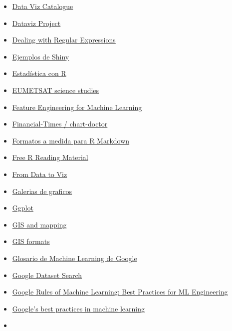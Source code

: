 \documentclass[
  letterpaper,
  DIV=11,
  numbers=noendperiod]{scrartcl}
\begin{document}
\begin{itemize}
{  Scientist Roadmap}
\item
  \href{https://graphica.app/catalogue}{Data Viz Catalogue}
\item
  \href{https://datavizproject.com/}{Dataviz Project}
\item
  \href{http://uc-r.github.io/regex}{Dealing with Regular Expressions}
\item
  \href{http://zevross.com/blog/2016/04/19/r-powered-web-applications-with-shiny-a-tutorial-and-cheat-sheet-with-40-example-apps/}{Ejemplos
  de Shiny}
\item
  \href{https://www.cienciadedatos.net/estadistica-con-r.html}{Estadística
  con R}
\item
  \href{https://www.eumetsat.int/science-studies}{EUMETSAT science
  studies}
\item
  \href{https://trainindata.medium.com/feature-engineering-for-machine-learning-a-comprehensive-overview-a7ad04c896f8}{Feature
  Engineering for Machine Learning}
\item
  \href{https://github.com/Financial-Times/chart-doctor/tree/main/visual-vocabulary}{Financial-Times
  / chart-doctor}
\item
  \href{http://www.r-bloggers.com/r-markdown-custom-formats/}{Formatos a
  medida para R Markdown}
\item
  \href{https://committedtotape.shinyapps.io/freeR/}{Free R Reading
  Material}
\item
  \href{https://www.data-to-viz.com/}{From Data to Viz}
\item
  \href{http://www.r-graph-gallery.com/}{Galerias de graficos}
\item
  \href{http://socviz.co/}{Ggplot}
\item
  \href{https://nowosad.github.io/SIGR2021/workshop1/workshop1_jn.html\#1}{GIS
  and mapping}
\item
  \href{https://atlas.co/formats/}{GIS formats}
\item
  \href{https://developers.google.com/machine-learning/glossary/}{Glosario
  de Machine Learning de Google}
\item
  \href{datasetsearch.research.google.com}{Google Dataset Search}
\item
  \href{http://martin.zinkevich.org/rules_of_ml/rules_of_ml.pdf}{Google
  Rules of Machine Learning: Best Practices for ML Engineering}
\item
  \href{https://developers.google.com/machine-learning/guides/rules-of-ml/}{Google's
  best practices in machine learning}
\item

\end{itemize}
\end{document}
